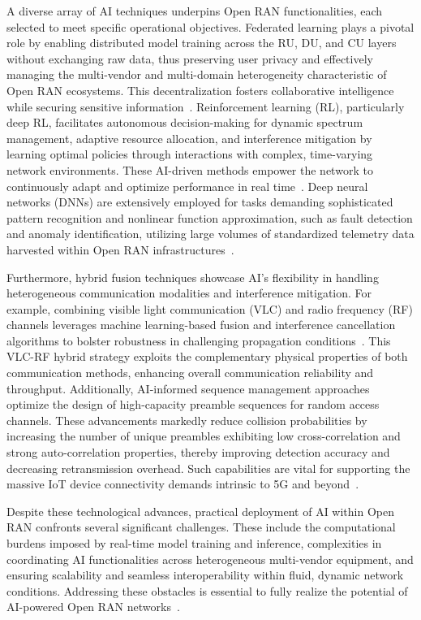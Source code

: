 \documentclass[sigconf]{acmart}
\begin{document}
A diverse array of AI techniques underpins Open RAN functionalities, each selected to meet specific operational objectives. Federated learning plays a pivotal role by enabling distributed model training across the RU, DU, and CU layers without exchanging raw data, thus preserving user privacy and effectively managing the multi-vendor and multi-domain heterogeneity characteristic of Open RAN ecosystems. This decentralization fosters collaborative intelligence while securing sensitive information~\cite{ref54}. Reinforcement learning (RL), particularly deep RL, facilitates autonomous decision-making for dynamic spectrum management, adaptive resource allocation, and interference mitigation by learning optimal policies through interactions with complex, time-varying network environments. These AI-driven methods empower the network to continuously adapt and optimize performance in real time~\cite{ref21,ref22}. Deep neural networks (DNNs) are extensively employed for tasks demanding sophisticated pattern recognition and nonlinear function approximation, such as fault detection and anomaly identification, utilizing large volumes of standardized telemetry data harvested within Open RAN infrastructures~\cite{ref23,ref24}.

Furthermore, hybrid fusion techniques showcase AI's flexibility in handling heterogeneous communication modalities and interference mitigation. For example, combining visible light communication (VLC) and radio frequency (RF) channels leverages machine learning-based fusion and interference cancellation algorithms to bolster robustness in challenging propagation conditions~\cite{ref25}. This VLC-RF hybrid strategy exploits the complementary physical properties of both communication methods, enhancing overall communication reliability and throughput. Additionally, AI-informed sequence management approaches optimize the design of high-capacity preamble sequences for random access channels. These advancements markedly reduce collision probabilities by increasing the number of unique preambles exhibiting low cross-correlation and strong auto-correlation properties, thereby improving detection accuracy and decreasing retransmission overhead. Such capabilities are vital for supporting the massive IoT device connectivity demands intrinsic to 5G and beyond~\cite{ref21}.

Despite these technological advances, practical deployment of AI within Open RAN confronts several significant challenges. These include the computational burdens imposed by real-time model training and inference, complexities in coordinating AI functionalities across heterogeneous multi-vendor equipment, and ensuring scalability and seamless interoperability within fluid, dynamic network conditions. Addressing these obstacles is essential to fully realize the potential of AI-powered Open RAN networks~\cite{ref49,ref54}.
\end{document}
